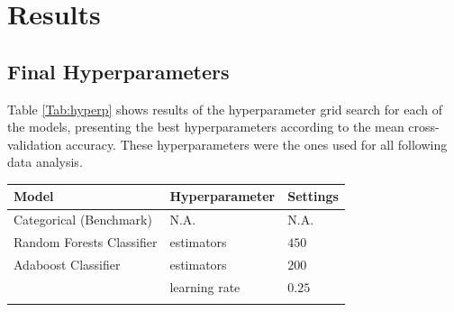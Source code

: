 \documentclass{bioinfo}
\begin{document}


\section{Results}

\subsection{Final Hyperparameters}
Table \ref{Tab:hyperp} shows results of the hyperparameter grid search for each of the models, presenting the best hyperparameters according to the mean cross-validation accuracy. These hyperparameters were the ones used for all following data analysis.

\begin{table}[!h]
 {\begin{tabular}{@{}lll@{}}\toprule Model  & Hyperparameter & Settings \\\midrule
Categorical (Benchmark) & N.A. &  N.A.   \\
Random Forests Classifier & estimators & $450$ \\
Adaboost Classifier & estimators & $200$ \\
                    & learning rate & $0.25$ \\\botrule
\end{tabular}}{}
\end{table}
\end{document}
